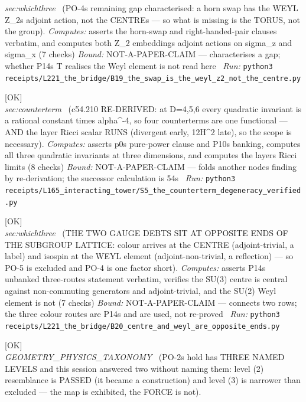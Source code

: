 \begin{description}
\textit{sec:whichthree} \ (PO-4s remaining gap characterised: a horn swap has the WEYL Z\_2s adjoint action, not the CENTREs --- so what is missing is the TORUS, not the group). 
\emph{Computes:} asserts the horn-swap and right-handed-pair clauses verbatim, and computes both Z\_2 embeddings adjoint actions on sigma\_z and sigma\_x (7 checks)
 \emph{Bound:} NOT-A-PAPER-CLAIM --- characterises a gap; whether P14s T realises the Weyl element is not read here
\ \emph{Run:} \texttt{python3 receipts/L221\_the\_bridge/B19\_the\_swap\_is\_the\_weyl\_z2\_not\_the\_centre.py}
\item[\label{rcpt:S5_the_counterterm_degeneracy_verified}\texttt{S5\_the\_counterterm\_degeneracy\_verified}]\hfill\textsf{[OK]}\\
\textit{sec:counterterm} \ (c54.210 RE-DERIVED: at D=4,5,6 every quadratic invariant is a rational constant times alpha\textasciicircum{}-4, so four counterterms are one functional --- AND the layer Ricci scalar RUNS (divergent early, 12H\textasciicircum{}2 late), so the scope is necessary). 
\emph{Computes:} asserts p0s pure-power clause and P10s banking, computes all three quadratic invariants at three dimensions, and computes the layers Ricci limits (8 checks)
 \emph{Bound:} NOT-A-PAPER-CLAIM --- folds another nodes finding by re-derivation; the successor calculation is 54s
\ \emph{Run:} \texttt{python3 receipts/L165\_interacting\_tower/S5\_the\_counterterm\_degeneracy\_verified.py}
\item[\label{rcpt:B20_centre_and_weyl_are_opposite_ends}\texttt{B20\_centre\_and\_weyl\_are\_opposite\_ends}]\hfill\textsf{[OK]}\\
\textit{sec:whichthree} \ (THE TWO GAUGE DEBTS SIT AT OPPOSITE ENDS OF THE SUBGROUP LATTICE: colour arrives at the CENTRE (adjoint-trivial, a label) and isospin at the WEYL element (adjoint-non-trivial, a reflection) --- so PO-5 is excluded and PO-4 is one factor short). 
\emph{Computes:} asserts P14s unbanked three-routes statement verbatim, verifies the SU(3) centre is central against non-commuting generators and adjoint-trivial, and the SU(2) Weyl element is not (7 checks)
 \emph{Bound:} NOT-A-PAPER-CLAIM --- connects two rows; the three colour routes are P14s and are used, not re-proved
\ \emph{Run:} \texttt{python3 receipts/L221\_the\_bridge/B20\_centre\_and\_weyl\_are\_opposite\_ends.py}
\item[\label{rcpt:B21_the_three_levels_audited}\texttt{B21\_the\_three\_levels\_audited}]\hfill\textsf{[OK]}\\
\textit{GEOMETRY\_PHYSICS\_TAXONOMY} \ (PO-2s hold has THREE NAMED LEVELS and this session answered two without naming them: level (2) resemblance is PASSED (it became a construction) and level (3) is narrower than excluded --- the map is exhibited, the FORCE is not). 

\end{description}
